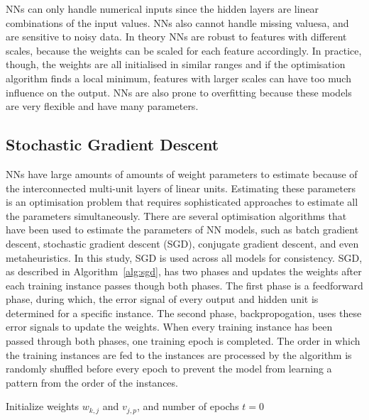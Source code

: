 \documentclass[conference]{IEEEtran}
\begin{document}
	NNs can only handle numerical inputs since the hidden layers are linear combinations of the input values. NNs also cannot handle missing valuesa, and are sensitive to noisy data. In theory NNs are robust to features with different scales, because the weights can be scaled for each feature accordingly. In practice, though, the weights are all initialised in similar ranges and if the optimisation algorithm finds a local minimum, features with larger scales can have too much influence on the output. NNs are also prone to overfitting because these models are very flexible and have many parameters.
	
	\subsection{Stochastic Gradient Descent}
	
	NNs have large amounts of amounts of weight parameters to estimate because of the interconnected multi-unit layers of linear units. Estimating these parameters is an optimisation problem that requires sophisticated approaches to estimate all the parameters simultaneously. There are several optimisation algorithms that have been used to estimate the parameters of NN models, such as batch gradient descent, stochastic gradient descent (SGD), conjugate gradient descent, and even metaheuristics. In this study, SGD is used across all models for consistency. SGD, as described in Algorithm~\ref{alg:sgd}, has two phases and updates the weights after each training instance passes though both phases. The first phase is a feedforward phase, during which, the error signal of every output and hidden unit is determined for a specific instance. The second phase, backpropogation, uses these error signals to update the weights. When every training instance has been passed through both phases, one training epoch is completed. The order in which the training instances are fed to the instances are processed by the algorithm is randomly shuffled before every epoch to prevent the model from learning a pattern from the order of the instances.
	
	\begin{algorithm}
		\caption{Stochastic Gradient Descent}
		\label{alg:sgd}
		Initialize weights $w_{k, j}$ and $v_{j, p}$, and number of epochs $t = 0$\;
		
		
	\end{algorithm}
	
\end{document}
